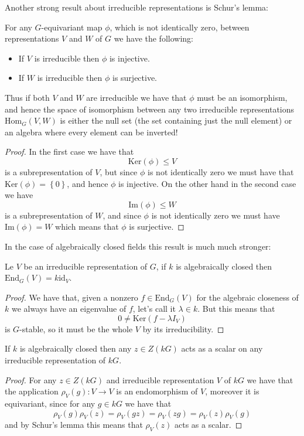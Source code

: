\documentclass[11pt]{scrartcl}
\newcommand{\Immagine}[1]{\text{Im}\left(#1\right)}
\renewcommand{\ker}[1]{\text{Ker}\left(#1\right)}
\begin{document}
	Another strong result about irreducible representations is Schur's lemma:
	\begin{lemma}[Schur]
		For any $G$-equivariant map $\phi$, which is not identically zero, between representations $V$ and $W$ of $G$ we have the following:
		\begin{itemize}
			\item[(i)] If $V$ is irreducible then $\phi$ is injective.
			\item[(ii)] If $W$ is irreducible then $\phi$ is surjective.
		\end{itemize}
		Thus if both $V$ and $W$ are irreducible we have that $\phi$ must be an isomorphism, and hence the space of isomorphism between any two irreducible representations $\text{Hom}_G(V,W)$ is either the null set (the set containing just the null element) or an algebra where every element can be inverted!
	\end{lemma}
	\begin{proof}
		In the first case we have that 
		$$\ker{\phi}\le V$$
		is a subrepresentation of $V$, but since $\phi$ is not identically zero we must have that $\ker{\phi}=\left\{0\right\}$, and hence $\phi$ is injective. On the other hand in the second case we have 
		$$\Immagine{\phi}\le W$$
		is a subrepresentation of $W$, and since $\phi$ is not identically zero we must have $\Immagine{\phi}=W$ which means that $\phi$ is surjective.
	\end{proof}
	In the case of algebraically closed fields this result is much much stronger:
	\begin{corollary}
		Le $V$ be an irreducible representation of $G$, if $k$ is algebraically closed then $\text{End}_G(V)=k\text{id}_V$.
	\end{corollary}
	\begin{proof}
		We have that, given a nonzero $f\in \text{End}_G(V)$ for the algebraic closeness of $k$ we always have an eigenvalue of $f$, let's call it $\lambda\in k$. But this means that
		$$0\ne \ker{f-\lambda I_V}$$
		is $G$-stable, so it must be the whole $V$ by its irreducibility.
	\end{proof}
	\begin{corollary}
		If $k$ is algebraically closed then any $z\in Z(kG)$ acts as a scalar on any irreducible representation of $kG$.
	\end{corollary}
	\begin{proof}
		For any $z\in Z(kG)$ and irreducible representation $V$ of $kG$ we have that the application $\rho_V(g):V\to V$ is an endomorphism of $V$, moreover it is equivariant, since for any $g\in kG$ we have that
		$$\rho_V(g)\rho_V(z)=\rho_V(gz)=\rho_V(zg)=\rho_V(z)\rho_V(g)$$
		and by Schur's lemma this means that $\rho_V(z)$ acts as a scalar.
	\end{proof}
	
\end{document}
